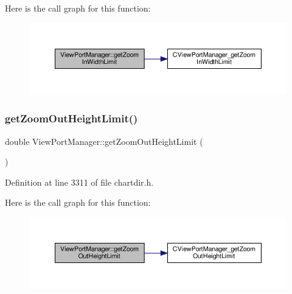 Here is the call graph for this function\+:
\nopagebreak
\begin{figure}[H]
\begin{center}
\leavevmode
\includegraphics[width=350pt]{class_view_port_manager_abb094171925d74b09ca34b4b5516d99a_cgraph}
\end{center}
\end{figure}
\mbox{\label{class_view_port_manager_aab5ba83002c831fef3831b883b0908ba}} 
\subsubsection{\texorpdfstring{get\+Zoom\+Out\+Height\+Limit()}{getZoomOutHeightLimit()}}
{\footnotesize\ttfamily double View\+Port\+Manager\+::get\+Zoom\+Out\+Height\+Limit (\begin{DoxyParamCaption}{ }\end{DoxyParamCaption})\hspace{0.3cm}{\ttfamily [inline]}}



Definition at line 3311 of file chartdir.\+h.

Here is the call graph for this function\+:
\nopagebreak
\begin{figure}[H]
\begin{center}
\leavevmode
\includegraphics[width=350pt]{class_view_port_manager_aab5ba83002c831fef3831b883b0908ba_cgraph}
\end{center}
\end{figure}
\mbox{\label{class_view_port_manager_ac9cb2aed6dfbe6dcf2049e8ccf1b8b47}} 
